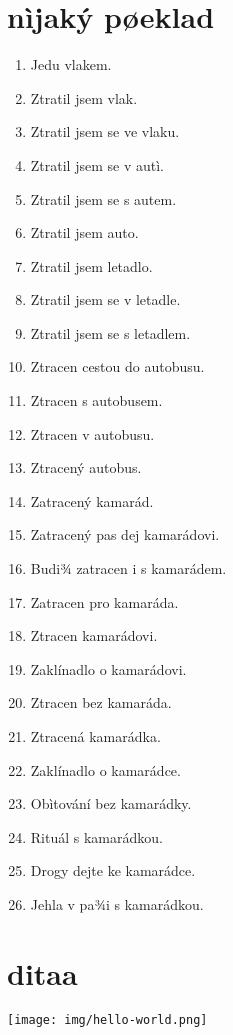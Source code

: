 \documentclass[11pt]{article}
\begin{document}
\section{nìjaký pøeklad}
\label{sec-3}

\begin{enumerate}
\item Jedu vlakem.
\item Ztratil jsem vlak.
\item Ztratil jsem se ve vlaku.
\item Ztratil jsem se v autì.
\item Ztratil jsem se s autem.
\item Ztratil jsem auto.
\item Ztratil jsem letadlo.
\item Ztratil jsem se v letadle.
\item Ztratil jsem se s letadlem.
\item Ztracen cestou do autobusu.
\item Ztracen s autobusem.
\item Ztracen v autobusu.
\item Ztracený autobus.
\item Zatracený kamarád.
\item Zatracený pas dej kamarádovi.
\item Budi¾ zatracen i s kamarádem.
\item Zatracen pro kamaráda.
\item Ztracen kamarádovi.
\item Zaklínadlo o kamarádovi.
\item Ztracen bez kamaráda.
\item Ztracená kamarádka.
\item Zaklínadlo o kamarádce.
\item Obìtování bez kamarádky.
\item Rituál s kamarádkou.
\item Drogy dejte ke kamarádce.
\item Jehla v pa¾i s kamarádkou.
\end{enumerate}

\section{ditaa}
\label{sec-4}

\texttt{[image: img/hello-world.png]}
\end{document}
